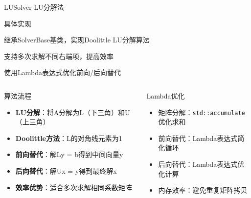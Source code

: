 \documentclass[UTF8,aspectratio=169]{beamer}
\begin{document}
\begin{frame}{LUSolver LU分解法}
    \begin{ytublock}{具体实现}
        \item 继承SolverBase基类，实现Doolittle LU分解算法
        \item 支持多次求解不同右端项，提高效率
        \item 使用Lambda表达式优化前向/后向替代
    \end{ytublock}

    \begin{columns}
        \begin{block}{算法流程}
            \begin{itemize}
                \item \textbf{LU分解}：将A分解为L（下三角）和U（上三角）
                \item \textbf{Doolittle方法}：L的对角线元素为1
                \item \textbf{前向替代}：解Ly = b得到中间向量y
                \item \textbf{后向替代}：解Ux = y得到最终解x
                \item \textbf{效率优势}：适合多次求解相同系数矩阵
            \end{itemize}
        \end{block}

        \begin{block}{Lambda优化}
            \begin{itemize}
                \item 矩阵分解：\texttt{std::accumulate}优化求和
                \item 前向替代：Lambda表达式简化循环
                \item 后向替代：Lambda表达式优化计算
                \item 内存效率：避免重复矩阵拷贝
            \end{itemize}
        \end{block}
    \end{columns}
\end{frame}
\end{document}
